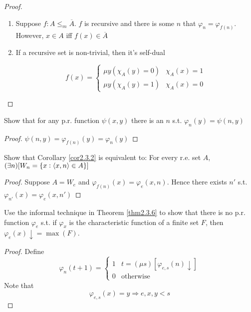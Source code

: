 \documentclass[11pt]{article}
\begin{document}
\begin{proof}
\begin{enumerate}
\item Suppose \(f:A\le_m\overbar{A}\). \(f\) is recursive and there is some
\(n\) that \(\varphi_n=\varphi_{f(n)}\). However, \(x\in A\) iff \(f(x)\in\overbar{A}\)
\item If a recursive set is non-trivial, then it's self-dual

\begin{equation*}
f(x)=
\begin{cases}
\mu y(\chi_A(y)=0)&\chi_A(x)=1\\
\mu y(\chi_A(y)=1)&\chi_A(x)=0
\end{cases}
\end{equation*}
\end{enumerate}
\end{proof}

\begin{exercise}
\label{ex2.3.9}
Show that for any p.r. function \(\psi(x,y)\) there is an \(n\) s.t. \(\varphi_n(y)=\psi(n,y)\)
\end{exercise}

\begin{proof}
\(\psi(n,y)=\varphi_{f(n)}(y)=\varphi_n(y)\)
\end{proof}

\begin{exercise}
\label{ex2.3.10}
Show that Corollary \ref{cor2.3.2} is equivalent to: For every r.e. set \(A\),
\((\exists n)[W_n=\{x:\langle x,n\rangle\in A\}]\)
\end{exercise}

\begin{proof}
Suppose \(A=W_e\) and \(\varphi_{f(n)}(x)=\varphi_e(x,n)\). Hence
there exists \(n'\) s.t. \(\varphi_{n'}(x)=\varphi_e(x,n')\)
\end{proof}

\begin{exercise}
\label{ex2.3.11}
Use the informal technique in Theorem \ref{thm2.3.6} to show that there is no
p.r. function \(\varphi_e\) s.t. if \(\varphi_x\) is the characteristic
function of a finite set \(F\), then \(\varphi_e(x)\downarrow=\max(F)\).
\end{exercise}

\begin{proof}
Define
\begin{equation*}
\varphi_n(t+1)=
\begin{cases}
1&t=(\mu s)[\varphi_{e,s}(n)\downarrow]\\
0&\text{otherwise}
\end{cases}
\end{equation*}
Note that
\begin{equation*}
\varphi_{e,s}(x)=y\Longrightarrow e,x,y<s
\end{equation*}
\end{proof}
\end{document}
